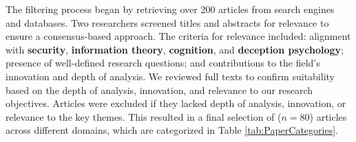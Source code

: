 The filtering process began by retrieving over 200 articles from search engines and databases. Two researchers screened titles and abstracts for relevance to ensure a consensus-based approach. The criteria for relevance included: alignment with \textbf{\MR security}, \textbf{information theory}, \textbf{cognition}, and \textbf{deception psychology}; presence of well-defined research questions; and contributions to the field's innovation and depth of analysis. 
We reviewed full texts to confirm suitability based on the depth of analysis, innovation, and relevance to our research objectives. 
Articles were excluded if they lacked depth of analysis, innovation, or relevance to the key themes. %
This resulted in a final selection of ($n=80$) articles across different domains, which are categorized in Table \ref{tab:PaperCategories}.






 

